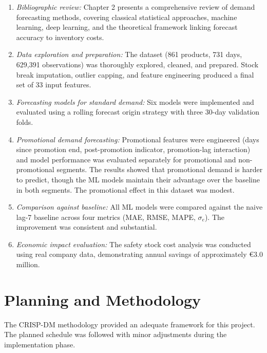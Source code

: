 \begin{enumerate}
    \item \textit{Bibliographic review:} Chapter 2 presents a comprehensive review of demand forecasting methods, covering classical statistical approaches, machine learning, deep learning, and the theoretical framework linking forecast accuracy to inventory costs.

    \item \textit{Data exploration and preparation:} The dataset (861 products, 731 days, 629,391 observations) was thoroughly explored, cleaned, and prepared. Stock break imputation, outlier capping, and feature engineering produced a final set of 33 input features.

    \item \textit{Forecasting models for standard demand:} Six models were implemented and evaluated using a rolling forecast origin strategy with three 30-day validation folds.

    \item \textit{Promotional demand forecasting:} Promotional features were engineered (days since promotion end, post-promotion indicator, promotion-lag interaction) and model performance was evaluated separately for promotional and non-promotional segments. The results showed that promotional demand is harder to predict, though the ML models maintain their advantage over the baseline in both segments. The promotional effect in this dataset was modest.

    \item \textit{Comparison against baseline:} All ML models were compared against the naive lag-7 baseline across four metrics (MAE, RMSE, MAPE, $\sigma_e$). The improvement was consistent and substantial.

    \item \textit{Economic impact evaluation:} The safety stock cost analysis was conducted using real company data, demonstrating annual savings of approximately \euro3.0 million.
\end{enumerate}

\section{Planning and Methodology}

The CRISP-DM methodology provided an adequate framework for this project. The planned schedule was followed with minor adjustments during the implementation phase.

